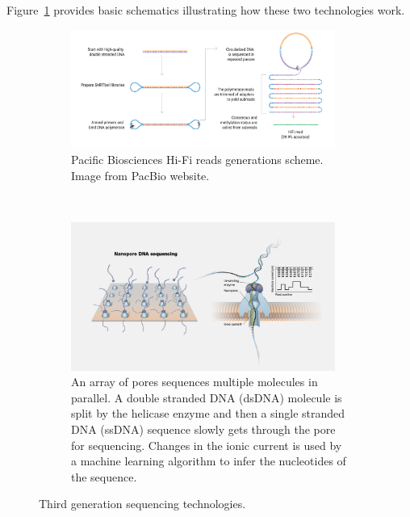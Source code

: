 Figure~\ref{fig:sequencing_technologies} provides basic schematics illustrating how these two technologies work.\\ 
\begin{figure}[!ht]
	\centering
	\begin{subfigure}[b]{0.95\textwidth}
		\centering
		\includegraphics[width=0.95\textwidth]{figures/background/hifi_pacbio.png}
		\caption{Pacific Biosciences Hi-Fi reads generations scheme. Image from PacBio website.} 
	\end{subfigure}%
	\\
	\begin{subfigure}[b]{0.95\textwidth}
		\centering
		\includegraphics[width=0.95\textwidth]{figures/background/nanopore_sequencing.jpg}
		\caption{An array of pores sequences multiple molecules in parallel. A double stranded DNA (\gls{dsDNA}) molecule is split by the helicase enzyme and then a single stranded DNA (\gls{ssDNA}) sequence slowly gets through the pore for sequencing. Changes in the ionic current is used by a machine learning algorithm to infer the nucleotides of the sequence.} 
	\end{subfigure}%
	\caption{Third generation sequencing technologies.}
	\label{fig:sequencing_technologies}
\end{figure}

